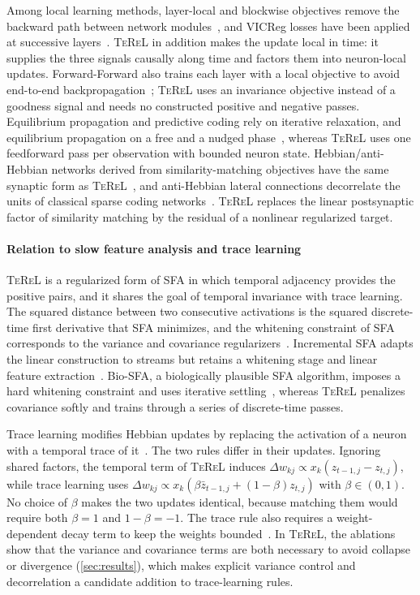 \documentclass[11pt]{article}
\newcommand{\TeReL}{\textsc{TeReL}}
\begin{document}
Among local learning methods, layer-local and blockwise objectives remove the
backward path between network
modules~\cite{lowe2019,xiong2020,illing2021,siddiqui2024}, and VICReg losses
have been applied at successive layers~\cite{datta2025}. \TeReL{} in addition
makes the update local in time: it supplies the three signals causally along
time and factors them into neuron-local updates. Forward-Forward also trains each
layer with a local objective to avoid end-to-end
backpropagation~\cite{hinton2022}; \TeReL{} uses an invariance objective
instead of a goodness signal and needs no constructed positive and negative
passes. Equilibrium propagation and predictive coding rely on iterative
relaxation, and equilibrium propagation on a free and a nudged
phase~\cite{scellier2017,rao1999,lecun2006}, whereas \TeReL{} uses one
feedforward pass per observation with bounded neuron state.
Hebbian/anti-Hebbian networks derived from similarity-matching objectives have
the same synaptic form as \TeReL{}~\cite{pehlevan2015,pehlevan2018}, and
anti-Hebbian lateral connections decorrelate the units of classical sparse
coding networks~\cite{foldiak1990}. \TeReL{} replaces the linear postsynaptic
factor of similarity matching by the residual of a nonlinear regularized
target.

\paragraph{Relation to slow feature analysis and trace learning}
\TeReL{} is a regularized form of SFA in which temporal adjacency provides
the positive pairs, and it shares the goal of temporal invariance with trace
learning. The squared distance between
two consecutive activations is the squared discrete-time first derivative
that SFA minimizes, and the whitening constraint of SFA corresponds to the
variance and covariance regularizers~\cite{wiskott2002}. Incremental SFA
adapts the linear construction to streams but retains a whitening stage and
linear feature extraction~\cite{kompella2012}. Bio-SFA, a biologically
plausible SFA algorithm, imposes a hard whitening constraint and uses
iterative settling~\cite{lipshutz2020}, whereas \TeReL{} penalizes covariance
softly and trains through a series of discrete-time passes.

Trace learning modifies Hebbian updates by replacing the activation of a
neuron with a temporal trace of it~\cite{foldiak1991,stringer2002}. The two
rules differ in their updates. Ignoring shared factors, the temporal term of \TeReL{} induces
$\Delta w_{kj}\propto x_k(z_{t-1,j}-z_{t,j})$, while trace learning uses
$\Delta w_{kj}\propto x_k(\beta\bar z_{t-1,j}+(1-\beta)z_{t,j})$ with
$\beta\in(0,1)$. No choice of $\beta$ makes the two updates identical, because
matching them would require both $\beta=1$ and $1-\beta=-1$. The trace rule
also requires a weight-dependent decay term to keep the weights
bounded~\cite{foldiak1991}. In \TeReL{}, the ablations show that the variance
and covariance terms are both necessary to avoid collapse or divergence
(\cref{sec:results}), which makes explicit variance control and
decorrelation a candidate addition to trace-learning rules.
\end{document}
